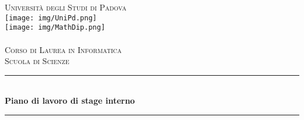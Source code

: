 \begin{titlepage}
    
    \newcommand{\HRule}{\rule{\linewidth}{0.5mm}} 
    
    \center
    
    
    \textsc{\LARGE Università degli Studi di Padova}\\[1cm] 
    
    
    \texttt{[image: img/UniPd.png]}\\[1cm]
    
    \texttt{[image: img/MathDip.png]}\\
    \textsc{\dipartimento}\\[1.2cm]
    \textsc{\Large Corso di Laurea in Informatica}\\[0.5cm] 
    
    \textsc{\large Scuola di Scienze}\\[0.5cm] 
    
    \vspace{1.9cm}
    
    
    \HRule \\[0.5cm]
    { \huge \bfseries Piano di lavoro di stage interno}\\ %
    \HRule \\[1.2cm]
    
    

\end{titlepage}
